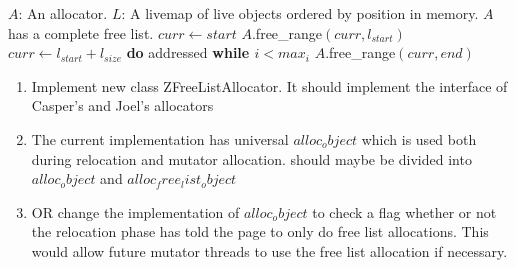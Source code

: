 \begin{algorithm}{}
    \caption{$(A,L)$}
    \label{alg:init}
    \begin{algorithmic}[1]
        \Require 
        \Statex $A$: An allocator.
        \Statex $L$: A livemap of live objects ordered by position in memory. 
        \Ensure 
        \Statex $A$ has a complete free list.
        \State $curr\gets start$ 
        \State $A$.free\_range$(curr, l_{start})$ 
        \EndIf
        \State $curr\gets l_{start} + l_{size}$ 
        \EndFor
        \State \textbf{do}
        \State \indent addressed
        \State \textbf{while $i < max_i$}
        \State $A$.free\_range$(curr,end)$ 
    \end{algorithmic}
\end{algorithm}

\begin{enumerate}
    \item Implement new class ZFreeListAllocator. It should implement the interface of Casper's and Joel's allocators
    
    \item The current implementation has universal $alloc_object$ which is used both during relocation and mutator allocation. should maybe be divided into $alloc_object$ and $alloc_free_list_object$
    
    \item OR change the implementation of $alloc_object$ to check a flag whether or not the relocation phase has told the page to only do free list allocations. This would allow future mutator threads to use the free list allocation if necessary. 
\end{enumerate}

